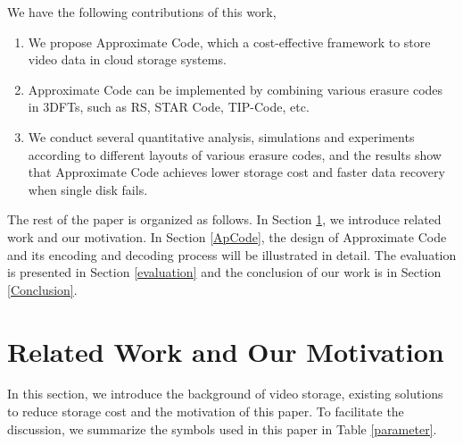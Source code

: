 \documentclass[sigconf]{acmart}
\begin{document}
We have the following contributions of this work,
\begin{enumerate}
\item We propose Approximate Code, which a cost-effective framework to store video data in cloud storage systems.
\item Approximate Code can be implemented by combining various erasure codes in 3DFTs, such as RS, STAR Code, TIP-Code, etc.
\item We conduct several quantitative analysis, simulations and experiments according to different layouts of various erasure codes, and the results show that Approximate Code achieves lower storage cost and faster data recovery when single disk fails.
\end{enumerate}

The rest of the paper is organized as follows. In Section \ref{RelatedWork}, we introduce related work and our motivation.
In Section \ref{ApCode}, the design of Approximate Code and its encoding and decoding process will be illustrated in detail.
The evaluation is presented in Section \ref{evaluation} and the conclusion of our work is in Section \ref{Conclusion}.

\section{Related Work and Our Motivation}\label{RelatedWork}
In this section, we introduce the background of video storage, existing solutions to reduce storage cost and the motivation of this paper.
To facilitate the discussion, we summarize the symbols used in this paper in Table \ref{parameter}.
\end{document}
